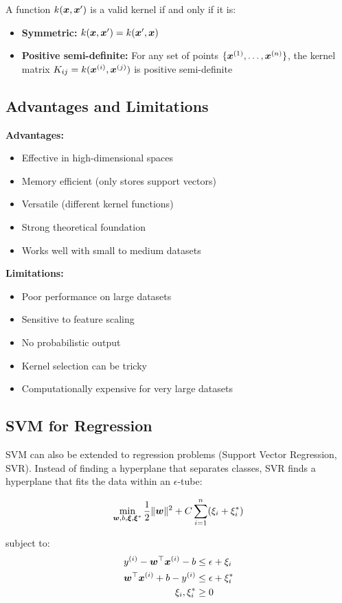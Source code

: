 A function $k(\boldsymbol{x}, \boldsymbol{x}')$ is a valid kernel if and only if it is:
\begin{itemize}
    \item \textbf{Symmetric:} $k(\boldsymbol{x}, \boldsymbol{x}') = k(\boldsymbol{x}', \boldsymbol{x})$
    \item \textbf{Positive semi-definite:} For any set of points $\{\boldsymbol{x}^{(1)}, \ldots, \boldsymbol{x}^{(n)}\}$, the kernel matrix $K_{ij} = k(\boldsymbol{x}^{(i)}, \boldsymbol{x}^{(j)})$ is positive semi-definite
\end{itemize}

\subsection{Advantages and Limitations}

\textbf{Advantages:}
\begin{itemize}
    \item Effective in high-dimensional spaces
    \item Memory efficient (only stores support vectors)
    \item Versatile (different kernel functions)
    \item Strong theoretical foundation
    \item Works well with small to medium datasets
\end{itemize}

\textbf{Limitations:}
\begin{itemize}
    \item Poor performance on large datasets
    \item Sensitive to feature scaling
    \item No probabilistic output
    \item Kernel selection can be tricky
    \item Computationally expensive for very large datasets
\end{itemize}

\subsection{SVM for Regression}

SVM can also be extended to regression problems (Support Vector Regression, SVR). Instead of finding a hyperplane that separates classes, SVR finds a hyperplane that fits the data within an $\epsilon$-tube:

\begin{equation}
\min_{\boldsymbol{w}, b, \boldsymbol{\xi}, \boldsymbol{\xi}^*} \frac{1}{2}\|\boldsymbol{w}\|^2 + C \sum_{i=1}^{n} (\xi_i + \xi_i^*)
\end{equation}

subject to:
\begin{align}
y^{(i)} - \boldsymbol{w}^\top \boldsymbol{x}^{(i)} - b &\leq \epsilon + \xi_i \\
\boldsymbol{w}^\top \boldsymbol{x}^{(i)} + b - y^{(i)} &\leq \epsilon + \xi_i^* \\
\xi_i, \xi_i^* &\geq 0
\end{align}

